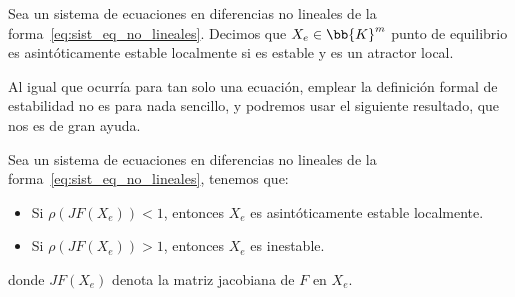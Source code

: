 \begin{definicion}
    Sea un sistema de ecuaciones en diferencias no lineales de la forma~\ref{eq:sist_eq_no_lineales}. Decimos que $X_e\in \bb{K}^m$ punto de equilibrio es asintóticamente estable localmente si es estable y es un atractor local.
\end{definicion}

Al igual que ocurría para tan solo una ecuación, emplear la definición formal de estabilidad no es para nada sencillo, y podremos usar el siguiente resultado, que nos es de gran ayuda.
\begin{prop}
    Sea un sistema de ecuaciones en diferencias no lineales de la forma~\ref{eq:sist_eq_no_lineales}, tenemos que:
    \begin{itemize}
        \item Si $\rho(JF(X_e))<1$, entonces $X_e$ es asintóticamente estable localmente.

        \item Si $\rho(JF(X_e))>1$, entonces $X_e$ es inestable.
    \end{itemize}
    donde $JF(X_e)$ denota la matriz jacobiana de $F$ en $X_e$.
\end{prop}

